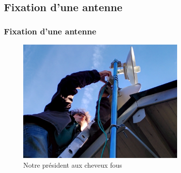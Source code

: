 \documentclass[handout]{beamer}
\begin{document}
	\subsection{Fixation d'une antenne}
		\begin{frame}
		\frametitle{Fixation d'une antenne}
		\vspace{-5px}
		\begin{center}
			\begin{figure}[h]
				\includegraphics[width=0.75\textwidth]{images/jossAntenne.jpg}
				\caption{Notre président aux cheveux fous}
			\end{figure}
		\end{center}
		
		\end{frame}
\end{document}
